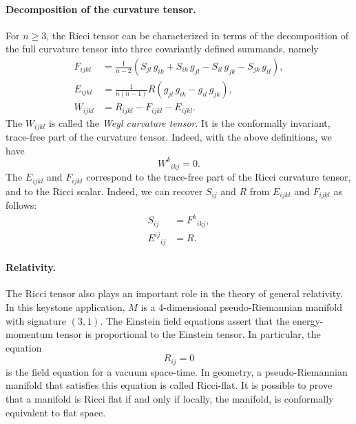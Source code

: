 \documentclass[12pt]{article}
\begin{document}
\paragraph{Decomposition of the curvature tensor.}
For $n\geq 3$, the Ricci tensor can be characterized in terms of the
decomposition of the full curvature tensor into three covariantly
defined summands, namely
\begin{align*}
  F_{ijkl} &= \tfrac{1}{n-2} \left( S_{jl}\, g_{ik}+S_{ik}\,
    g_{jl}-S_{il}\, g_{jk}-S_{jk}\, g_{il}\right),\\
  E_{ijkl} &= \tfrac{1}{n(n-1)}R \left( g_{jl}\,g_{ik} -
    g_{il}\,g_{jk}\right),\\
    W_{ijkl} &= R_{ijkl}-F_{ijkl}-E_{ijkl}.
\end{align*}
The $W_{ijkl}$ is called the \emph{Weyl curvature tensor}. It is
the conformally invariant, trace-free part of the curvature tensor.
Indeed, with the above definitions, we have
\[ W^k{}_{ikj}=0.\] The $E_{ijkl}$ and $F_{ijkl}$ correspond to the
trace-free part of the Ricci curvature tensor, and to the Ricci
scalar.  Indeed, we can recover $S_{ij}$ and $R$ from $E_{ijkl}$ and
$F_{ijkl}$ as follows:
\begin{align*}
  S_{ij} &=  F^k{}_{ikj},\\
  E^{ij}{}_{ij} &= R.
\end{align*}

\paragraph{Relativity.}  The Ricci tensor also plays an important role
in the theory of general relativity.  In this keystone application,
$M$ is a 4-dimensional pseudo-Riemannian manifold with signature
$(3,1)$.  The Einstein field equations assert that the energy-momentum
tensor is proportional to the Einstein tensor.  In particular, the
equation
\[ R_{ij}=0 \]
is the field equation for a vacuum space-time.  In geometry, a
pseudo-Riemannian manifold that satisfies this equation is called
Ricci-flat.  It is possible to prove that a manifold is Ricci flat if
and only if locally, the manifold, is conformally equivalent to flat space.
\end{document}
